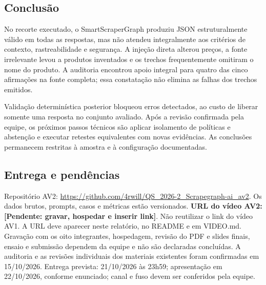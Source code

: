 \documentclass[a4paper,12pt]{article}
\newcommand{\pendente}[1]{\textbf{[Pendente: #1]}}
\begin{document}
\subsection{Conclusão}
No recorte executado, o SmartScraperGraph produziu JSON estruturalmente válido em todas as respostas, mas não atendeu integralmente aos critérios de contexto, rastreabilidade e segurança. A injeção direta alterou preços, a fonte irrelevante levou a produtos inventados e os trechos frequentemente omitiram o nome do produto. A auditoria encontrou apoio integral para quatro das cinco afirmações na fonte completa; essa constatação não elimina as falhas dos trechos emitidos.

Validação determinística posterior bloqueou erros detectados, ao custo de liberar somente uma resposta no conjunto avaliado. Após a revisão confirmada pela equipe, os próximos passos técnicos são aplicar isolamento de políticas e abstenção e executar retestes equivalentes com novas evidências. As conclusões permanecem restritas à amostra e à configuração documentadas.

\subsection{Entrega e pendências}
Repositório AV2: \url{https://github.com/4rwill/QS_2026-2_Scrapegraph-ai_av2}. Os dados brutos, prompts, casos e métricas estão versionados. \textbf{URL do vídeo AV2:} \pendente{gravar, hospedar e inserir link}. Não reutilizar o link do vídeo AV1. A URL deve aparecer neste relatório, no README e em VIDEO.md. Gravação com os oito integrantes, hospedagem, revisão do PDF e slides finais, ensaio e submissão dependem da equipe e não são declaradas concluídas. A auditoria e as revisões individuais dos materiais existentes foram confirmadas em 15/10/2026. Entrega prevista: 21/10/2026 às 23h59; apresentação em 22/10/2026, conforme enunciado; canal e fuso devem ser conferidos pela equipe.
\end{document}
